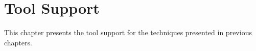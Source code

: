 \chapter{Tool Support\label{chapter:tool-support}}

This chapter presents the tool support for the techniques presented in previous chapters. 





